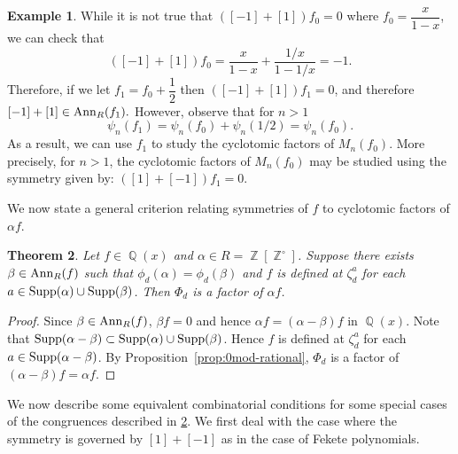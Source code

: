 \documentclass[12t,a4paper]{amsart}
\newtheorem{thm}{Theorem}[section]
\theoremstyle{definition}
\newtheorem{expl}[thm]{Example}
\DeclareMathOperator{\Z}{\mathbb{Z}}
\DeclareMathOperator{\Q}{\mathbb{Q}}
\DeclareMathOperator{\supp}{{\rm Supp}}
\newcommand{\Ann}{{\rm Ann}}
\numberwithin{equation}{section}
\begin{document}
{\begin{expl}
    While it is not true that $([-1]+[1])f_0 =0$ where $f_0 = \dfrac{x}{1-x}$, we can check that  
    \[ ([-1]+[1])f_0 = \frac{x}{1-x}+\frac{1/x}{1-1/x} = -1.\]
Therefore, if we let $f_1= f_0 +\dfrac{1}{2}$ then $([-1]+[1])f_1=0$, and therefore $[-1]+[1] \in \Ann_{R}(f_1).$ However, observe that for $n>1$ 
\[\psi_n(f_1)=\psi_n(f_0)+\psi_n(1/2)=\psi_n(f_0).\]
As a result, we can use $f_1$ to study the cyclotomic factors of $M_n(f_0).$ More precisely, for \(n>1\), the cyclotomic factors of \(M_n(f_0)\) may be studied using the symmetry given by: \(([1]+[-1])f_1=0\).

\end{expl}


We now state a general criterion relating symmetries of \(f\) to cyclotomic factors of \(\alpha f\). %

\begin{thm} \label{thm:mahler-congruence_revised}
   Let $f\in \Q(x)$ and $\alpha\in R=\Z[\Z^{\circ}]$.
    Suppose there exists $\beta\in \Ann_R(f)$ such that $\phi_d(\alpha)=\phi_d(\beta)$ and $f$ is defined at $\zeta_d^a$ for each $a \in \supp(\alpha)\cup \supp(\beta)$. Then $\Phi_d$ is a factor of $\alpha f$. 
\end{thm}
\begin{proof}
    Since $\beta\in \Ann_R(f)$, $\beta f=0$ and hence $\alpha f=(\alpha-\beta )f$ in $\Q(x)$. 
    Note that $\supp(\alpha-\beta)\subset \supp(\alpha)\cup \supp(\beta)$. Hence $f$ is defined at $\zeta_d^a$ for each $a\in \supp(\alpha-\beta)$. By Proposition~\ref{prop:0mod-rational}, $\Phi_d$ is a factor of $(\alpha-\beta )f=\alpha f$.
\end{proof}




{We now describe some equivalent combinatorial conditions for some special cases of the congruences described in \cref{thm:mahler-congruence_revised}. We first deal with the case where the symmetry is governed by $[1]+[-1]$ as in the case of Fekete polynomials.}



}
\end{document}
